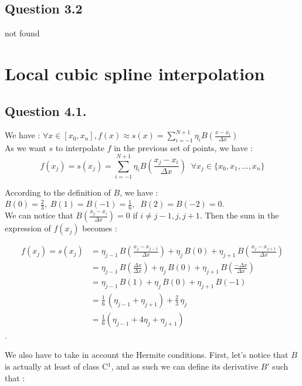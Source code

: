 \documentclass[10pt]{article}
\begin{document}
\subsection{Question 3.2}
not found

\newpage


\section{Local cubic spline interpolation}


\subsection{Question 4.1.}


We have : $\forall x \in [x_0, x_n], f(x) \approx s(x)= \sum_{i=-1}^{N+1} \eta_i B(\frac{x-x_i}{\Delta x})$\\

As we want $s$ to interpolate $f$ in the previous set of points, we have : $$f(x_j) = s(x_j)= \sum_{i=-1}^{N+1} \eta_i B(\frac{x_j-x_i}{\Delta x}) \;\; \forall x_j \in \lbrace x_0,x_1,..., x_n \rbrace$$


According to the definition of $B$, we have :
$B(0) = \frac{2}{3}, \; B(1) = B(-1) = \frac{1}{6},\;\; B(2) = B(-2) = 0 .$\\


We can notice that $B(\frac{x_j-x_i}{\Delta x}) = 0$ if $i \neq j-1, j, j+1$. Then the sum in the expression of $f(x_j)$ becomes :

\begin{align*}
f(x_j) = s(x_j) &= \eta_{j-1}\, B\left(\frac{x_j-x_{j-1}}{\Delta x}\right) + \eta_j\, B(0) + \eta_{j+1}\, B\left(\frac{x_j-x_{j+1}}{\Delta x}\right)\\
 &= \eta_{j-1}\, B\left(\frac{\Delta x}{\Delta x}\right) + \eta_j\, B(0) + \eta_{j+1}\, B\left(\frac{-\Delta x}{\Delta x}\right)\\
 &= \eta_{j-1}\, B(1) + \eta_j\, B(0) + \eta_{j+1}\, B(-1)\\
 &= \frac{1}{6} \, ( \eta_{j-1} + \eta_{j+1} ) + \frac{2}{3} \, \eta_j \\ 
 &= \frac{1}{6} ( \eta_{j-1} + 4 \eta_{j} + \eta_{j+1} )
\end{align*} .

We also have to take in account the Hermite conditions. First, let's notice that $B$ is actually at least of class C$^1$, and as such we can define its derivative $B'$ such that :\\
\end{document}
